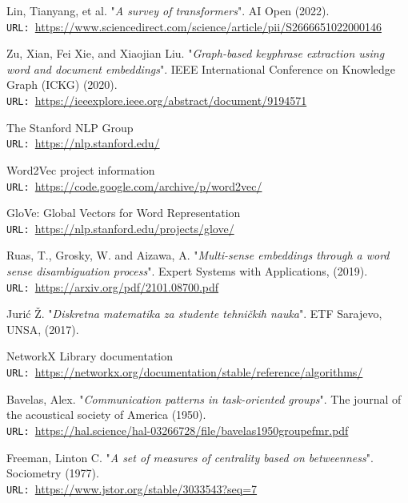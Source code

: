 \documentclass[12pt]{article}
\numberwithin{equation}{section}
\begin{document}
\begin{spacing}{1.5}
\begin{thebibliography}{8}
		Lin, Tianyang, et al. "\textit{A survey of transformers}". AI Open (2022).\\
		\texttt{URL: }\url{https://www.sciencedirect.com/science/article/pii/S2666651022000146}
		
		Zu, Xian, Fei Xie, and Xiaojian Liu. "\textit{Graph-based keyphrase extraction using word and document embeddings}". IEEE International Conference on Knowledge Graph (ICKG) (2020). \\
		\texttt{URL: }\url{https://ieeexplore.ieee.org/abstract/document/9194571}
		
		The Stanford NLP Group\\
		\texttt{URL: }\url{https://nlp.stanford.edu/}
		
		Word2Vec project information\\
		\texttt{URL: }\url{https://code.google.com/archive/p/word2vec/}
		
		GloVe: Global Vectors for Word Representation\\
		\texttt{URL: }\url{https://nlp.stanford.edu/projects/glove/}
		
		Ruas, T., Grosky, W. and Aizawa, A.  "\textit{Multi-sense embeddings through a word sense disambiguation process}". Expert Systems with Applications,  (2019). \\
		\texttt{URL: }\url{https://arxiv.org/pdf/2101.08700.pdf}
		
		Jurić Ž. "\textit{Diskretna matematika za studente tehničkih nauka}". ETF Sarajevo, UNSA, (2017). 
		
		NetworkX Library documentation\\
		\texttt{URL: }\url{https://networkx.org/documentation/stable/reference/algorithms/}
		
		Bavelas, Alex. "\textit{Communication patterns in task‐oriented groups}". The journal of the acoustical society of America (1950). \\
		\texttt{URL: }\url{https://hal.science/hal-03266728/file/bavelas1950groupefmr.pdf}
		
		Freeman, Linton C. "\textit{A set of measures of centrality based on betweenness}". Sociometry (1977). \\
		\texttt{URL: }\url{https://www.jstor.org/stable/3033543?seq=7}
		

\end{thebibliography}
\end{spacing}
\end{document}
